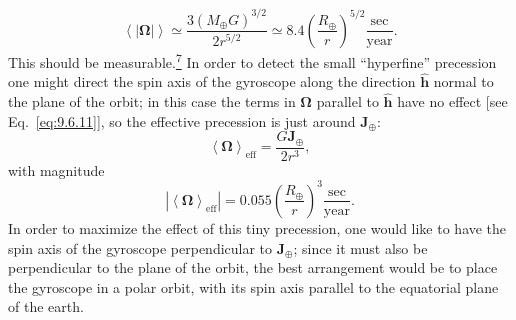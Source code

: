 \begin{equation}
  \left\langle|\boldsymbol\Omega|\right\rangle
  \simeq
  \frac{3(M_\oplus G)^{3/2}}{2r^{5/2}}
  \simeq
  8.4\left(\frac{R_\oplus}{r}\right)^{5/2}
  \frac{\text{sec}}{\text{year}}.
  \tag{9.6.21}\label{eq:9.6.21}
\end{equation}
This should be measurable.\hyperref[ch9-ref-7]{\textsuperscript{7}} In
order to detect the small ``hyperfine'' precession one might direct the spin
axis of the gyroscope along the direction \(\widehat{\mathbf h}\) normal to
the plane of the orbit; in this case the terms in
\(\boldsymbol\Omega\) parallel to \(\widehat{\mathbf h}\) have no effect
[see Eq.~\eqref{eq:9.6.11}], so the effective precession is just around
\(\mathbf J_\oplus\):
\begin{equation}
  \left\langle\boldsymbol\Omega\right\rangle_{\mathrm{eff}}
  =
  \frac{G\mathbf J_\oplus}{2r^3},
  \tag{9.6.22}\label{eq:9.6.22}
\end{equation}
with magnitude
\begin{equation}
  \left|
    \left\langle\boldsymbol\Omega\right\rangle_{\mathrm{eff}}
  \right|
  =
  0.055\left(\frac{R_\oplus}{r}\right)^3
  \frac{\text{sec}}{\text{year}}.
  \tag{9.6.23}\label{eq:9.6.23}
\end{equation}
In order to maximize the effect of this tiny precession, one would like to
have the spin axis of the gyroscope perpendicular to \(\mathbf J_\oplus\);
since it must also be perpendicular to the plane of the orbit, the best
arrangement would be to place the gyroscope in a polar orbit, with its spin
axis parallel to the equatorial plane of the earth.

